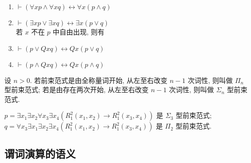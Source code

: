 \documentclass[
    color=black,
    device=normal,
    lang=cn
]{elegantnote}
\begin{document}
\begin{proposition}
    \hfill
    \begin{enumerate}[label = $\arabic*^\circ$]
        \item $\vdash (\forall x p \land \forall x q)\leftrightarrow \forall x(p\land q)$
        \item $\vdash (\exists x p \lor \exists x q)\leftrightarrow \exists x(p\lor q)$\\
              若 $x$ 不在 $p$ 中自由出现, 则有
        \item $\vdash (p\lor Qxq)\leftrightarrow Qx(p\lor q)$
        \item $\vdash (p\land Qxq)\leftrightarrow Qx(p\land q)$
    \end{enumerate}
\end{proposition}
\begin{definition}
    设 $n>0$. 若前束范式是由全称量词开始, 从左至右改变 $n-1$ 次词性, 则叫做 $\Pi_n$ 型前束范式;
    若是由存在两次开始, 从左至右改变 $n-1$ 次词性, 则叫做 $\Sigma_n$ 型前束范式.
\end{definition}
\begin{example}
    $p = \exists x_1\exists x_2\forall x_3\exists x_4 (R_1^2(x_1, x_2)\to R_1^2(x_3, x_4))$ 是 $\Sigma_3$ 型前束范式;\\
    $q = \forall x_3\exists x_1\exists x_2\exists x_4 (R_1^2(x_1, x_2)\to R_1^2(x_3, x_4))$ 是 $\Pi_2$ 型前束范式.
\end{example}

\newpage
\subsection{谓词演算的语义}
\end{document}
